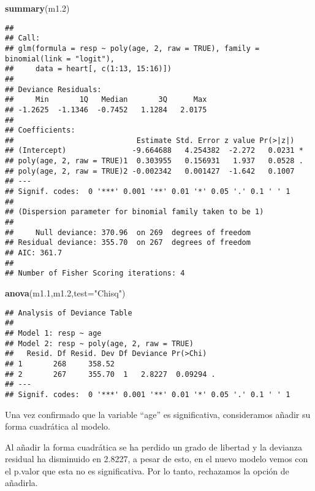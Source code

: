 \documentclass[]{article}
\newenvironment{Shaded}{\begin{snugshade}}{\end{snugshade}}
\newcommand{\KeywordTok}[1]{\textcolor[rgb]{0.13,0.29,0.53}{\textbf{#1}}}
\newcommand{\DataTypeTok}[1]{\textcolor[rgb]{0.13,0.29,0.53}{#1}}
\newcommand{\DecValTok}[1]{\textcolor[rgb]{0.00,0.00,0.81}{#1}}
\newcommand{\StringTok}[1]{\textcolor[rgb]{0.31,0.60,0.02}{#1}}
\newcommand{\NormalTok}[1]{#1}
\begin{document}
\begin{Shaded}
\begin{Highlighting}[]
\KeywordTok{summary}\NormalTok{(m1.}\DecValTok{2}\NormalTok{)}
\end{Highlighting}
\end{Shaded}

\begin{verbatim}
## 
## Call:
## glm(formula = resp ~ poly(age, 2, raw = TRUE), family = binomial(link = "logit"), 
##     data = heart[, c(1:13, 15:16)])
## 
## Deviance Residuals: 
##     Min       1Q   Median       3Q      Max  
## -1.2625  -1.1346  -0.7452   1.1284   2.0175  
## 
## Coefficients:
##                            Estimate Std. Error z value Pr(>|z|)  
## (Intercept)               -9.664688   4.254382  -2.272   0.0231 *
## poly(age, 2, raw = TRUE)1  0.303955   0.156931   1.937   0.0528 .
## poly(age, 2, raw = TRUE)2 -0.002342   0.001427  -1.642   0.1007  
## ---
## Signif. codes:  0 '***' 0.001 '**' 0.01 '*' 0.05 '.' 0.1 ' ' 1
## 
## (Dispersion parameter for binomial family taken to be 1)
## 
##     Null deviance: 370.96  on 269  degrees of freedom
## Residual deviance: 355.70  on 267  degrees of freedom
## AIC: 361.7
## 
## Number of Fisher Scoring iterations: 4
\end{verbatim}

\begin{Shaded}
\begin{Highlighting}[]
\KeywordTok{anova}\NormalTok{(m1.}\DecValTok{1}\NormalTok{,m1.}\DecValTok{2}\NormalTok{,}\DataTypeTok{test=}\StringTok{"Chisq"}\NormalTok{)  }
\end{Highlighting}
\end{Shaded}

\begin{verbatim}
## Analysis of Deviance Table
## 
## Model 1: resp ~ age
## Model 2: resp ~ poly(age, 2, raw = TRUE)
##   Resid. Df Resid. Dev Df Deviance Pr(>Chi)  
## 1       268     358.52                       
## 2       267     355.70  1   2.8227  0.09294 .
## ---
## Signif. codes:  0 '***' 0.001 '**' 0.01 '*' 0.05 '.' 0.1 ' ' 1
\end{verbatim}

Una vez confirmado que la variable ``age'' es significativa,
consideramos añadir su forma cuadrática al modelo.

Al añadir la forma cuadrática se ha perdido un grado de libertad y la
devianza residual ha disminuido en 2.8227, a pesar de esto, en el nuevo
modelo vemos con el p.valor que esta no es significativa. Por lo tanto,
rechazamos la opción de añadirla.
\end{document}
